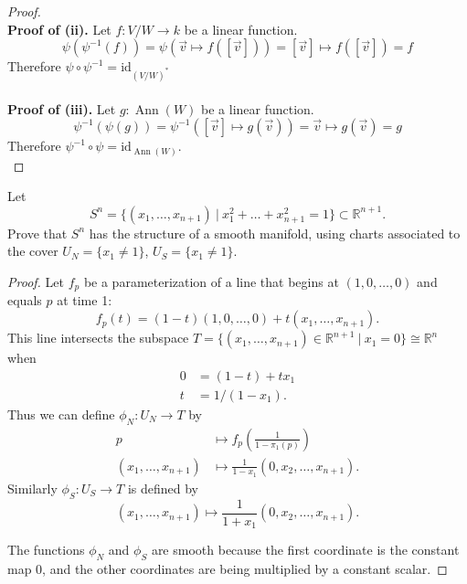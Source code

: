\documentclass{article}
\newenvironment{problem}[2][Problem]{\begin{trivlist}
\item[\hskip \labelsep {\bfseries #1}\hskip \labelsep {\bfseries #2.}]}{\end{trivlist}}
\begin{document}
\begin{proof}
  \\\textbf{Proof of (ii).}
  Let $f: V/W \rightarrow k$ be a linear function.
    \[
      \psi(\psi^{-1}(f))
      = \psi(\vec{v} \mapsto f([\vec{v}]))
      = [\vec{v}] \mapsto f([\vec{v}])
      = f
    \] Therefore $\psi \circ \psi^{-1} = \mathrm{id}_{(V/W)^*}$ \\
  \\\textbf{Proof of (iii).}
  Let $g: \operatorname{Ann}(W)$ be a linear function. \[
    \psi^{-1}(\psi(g))
    = \psi^{-1}([\vec{v}] \mapsto g(\vec{v}))
    = \vec{v} \mapsto g(\vec{v})
    = g
  \] Therefore $\psi^{-1} \circ \psi = \mathrm{id}_{\operatorname{Ann}(W)}$. \\
\end{proof}

\pagebreak

\begin{problem}{2}
  Let \[
    S^n = \{
      (x_1, \hdots, x_{n + 1})\ |\
      x_1^2 + \hdots + x_{n + 1}^2 = 1
    \} \subset \mathbb{R}^{n + 1}.
  \] Prove that $S^n$ has the structure of a smooth manifold,
  using charts associated to the cover $U_N = \{ x_1 \not= 1 \}$, $U_S = \{ x_1 \not= 1 \}$.
\end{problem}

\begin{proof}
  Let $f_p$ be a parameterization of a line that begins at $(1, 0, \hdots, 0)$ and
  equals $p$ at time 1: \[
    f_p(t) = (1 - t)(1, 0, \hdots, 0) + t(x_1, \hdots, x_{n + 1}).
  \]
  This line intersects the subspace
  $T = \{ (x_1, \hdots, x_{n + 1}) \in \mathbb{R}^{n + 1}\ |\ x_1 = 0\} \cong \mathbb{R}^n$
  when \begin{align*}
    0 &= (1 - t) + tx_1 \\
    t &= 1/(1 - x_1).
  \end{align*}
  Thus we can define $\phi_N: U_N \rightarrow T$ by \begin{align*}
    p &\mapsto f_p\left(\frac{1}{1-\pi_1(p)}\right) \\
    (x_1, \hdots, x_{n + 1}) &\mapsto \frac{1}{1-x_1}(0, x_2, \hdots, x_{n + 1}).
  \end{align*}
  Similarly $\phi_S: U_S \rightarrow T$ is defined by \[
    (x_1, \hdots, x_{n + 1}) \mapsto \frac{1}{1+x_1}(0, x_2, \hdots, x_{n + 1}).
  \]

  The functions $\phi_N$ and $\phi_S$ are smooth because the first coordinate is the
  constant map $0$, and the other coordinates are being multiplied by a constant scalar.
\end{proof}
\end{document}
